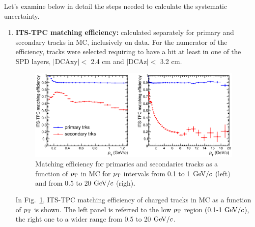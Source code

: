 Let's examine below in detail the steps needed to 
calculate the systematic uncertainty.
\begin{enumerate}
\item {\bf ITS-TPC matching efficiency:} calculated separately for 
primary and secondary tracks in MC, inclusively on data. For 
the numerator of the efficiency, tracks were selected requiring 
to have a hit at least in one of the SPD layers, 
$|$DCAxy$|<$ 2.4 cm and $|$DCAz$|<$ 3.2 cm.
\begin{figure}[!htb]
\centering
\includegraphics[width=1\textwidth]{FigCap4/ITSTPC_matchEff_vsPt_LowFullpt.eps}
\caption{Matching efficiency for primaries and secondaries tracks as a function of $p_{\rm T}$ in MC for $p_{\rm T}$ intervals from 0.1 to 1 $\mathrm{GeV}/c$ (left) and from 0.5 to 20 $\mathrm{GeV}/c$ (righ). }
\label{fig:matcheff_pt}
\end{figure}

In Fig.~\ref{fig:matcheff_pt}, ITS-TPC matching efficiency 
of charged tracks in MC as a function of 
$p_{\rm T}$ is shown. The left panel is referred to the low $p_{\rm T}$ region (0.1-1 $\mathrm{GeV}/c$), 
the right one to a wider range from 0.5 to 20 $\mathrm{GeV}/c$. 


\end{enumerate}
